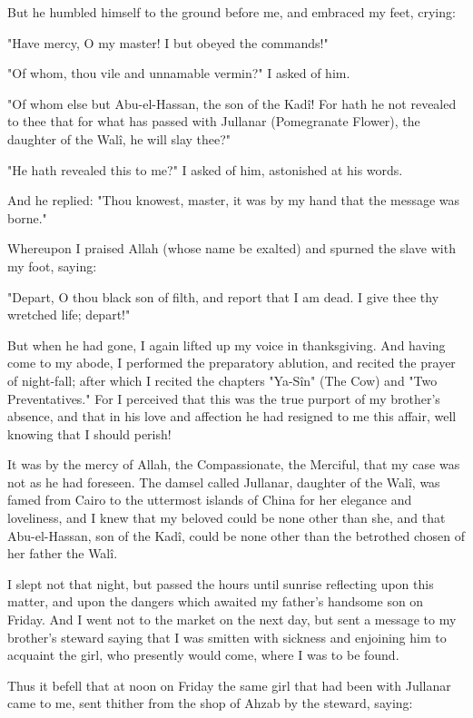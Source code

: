 But he humbled himself to the ground before me, and embraced my feet,
crying:

"Have mercy, O my master! I but obeyed the commands!"

"Of whom, thou vile and unnamable vermin?" I asked of him.

"Of whom else but Abu-el-Hassan, the son of the Kadî! For hath he not
revealed to thee that for what has passed with Jullanar (Pomegranate
Flower), the daughter of the Walî, he will slay thee?"

"He hath revealed this to me?" I asked of him, astonished at his
words.

And he replied: "Thou knowest, master, it was by my hand that the
message was borne."

Whereupon I praised Allah (whose name be exalted) and spurned the
slave with my foot, saying:

"Depart, O thou black son of filth, and report that I am dead. I give
thee thy wretched life; depart!"

But when he had gone, I again lifted up my voice in thanksgiving. And
having come to my abode, I performed the preparatory ablution, and
recited the prayer of night-fall; after which I recited the chapters
"Ya-Sîn" (The Cow) and "Two Preventatives." For I perceived that this
was the true purport of my brother's absence, and that in his love
and affection he had resigned to me this affair, well knowing that I
should perish!

It was by the mercy of Allah, the Compassionate, the Merciful, that my
case was not as he had foreseen. The damsel called Jullanar, daughter
of the Walî, was famed from Cairo to the uttermost islands of China
for her elegance and loveliness, and I knew that my beloved could be
none other than she, and that Abu-el-Hassan, son of the Kadî, could be
none other than the betrothed chosen of her father the Walî.

I slept not that night, but passed the hours until sunrise reflecting
upon this matter, and upon the dangers which awaited my father's
handsome son on Friday. And I went not to the market on the next day,
but sent a message to my brother's steward saying that I was smitten
with sickness and enjoining him to acquaint the girl, who presently
would come, where I was to be found.

Thus it befell that at noon on Friday the same girl that had been with
Jullanar came to me, sent thither from the shop of Ahzab by the
steward, saying:

